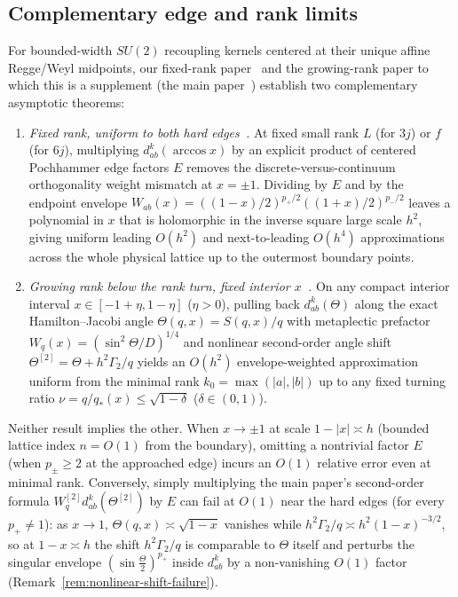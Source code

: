 \documentclass[11pt]{article}
\theoremstyle{definition}
\theoremstyle{remark}
\renewcommand{\_}{\oldunderscore\penalty0\hskip0pt\relax}
\begin{document}
\subsection{Complementary edge and rank limits}
For bounded-width $SU(2)$ recoupling kernels centered at their unique affine Regge/Weyl midpoints, our fixed-rank paper~\cite{LewisFixedRank} and the growing-rank paper to which this is a supplement (the main paper~\cite{LewisGrowingRank}) establish two complementary asymptotic theorems:
\begin{enumerate}[leftmargin=2em,itemsep=2pt]
\item \emph{Fixed rank, uniform to both hard edges~\cite{LewisFixedRank}.} At fixed small rank $L$ (for $3j$) or $f$ (for $6j$),
  multiplying $d^k_{ab}(\arccos x)$ by an explicit product of centered Pochhammer edge factors $E$ removes the
  discrete-versus-continuum orthogonality weight mismatch at $x=\pm 1$. Dividing by $E$ and by the endpoint envelope
  $W_{ab}(x)=((1-x)/2)^{p_+/2}((1+x)/2)^{p_-/2}$ leaves a polynomial in $x$ that is holomorphic in the inverse square large scale
  $h^2$, giving uniform leading $O(h^2)$ and next-to-leading $O(h^4)$ approximations across the whole physical lattice up to the
  outermost boundary points.
\item \emph{Growing rank below the rank turn, fixed interior $x$~\cite{LewisGrowingRank}.} On any compact interior interval
  $x\in[-1+\eta,1-\eta]$ ($\eta>0$), pulling back $d^k_{ab}(\Theta)$ along the exact Hamilton--Jacobi angle
  $\Theta(q,x)=S(q,x)/q$ with metaplectic prefactor $W_q(x)=(\sin^2\Theta/D)^{1/4}$ and nonlinear second-order angle shift
  $\Theta^{[2]}=\Theta+h^2\Gamma_2/q$ yields an $O(h^2)$ envelope-weighted approximation uniform from the minimal rank
  $k_0=\max(|a|,|b|)$ up to any fixed turning ratio $\nu=q/q_*(x)\le\sqrt{1-\delta}$ ($\delta\in(0,1)$).
\end{enumerate}

Neither result implies the other. When $x\to\pm 1$ at scale $1-|x|\asymp h$ (bounded lattice index $n=O(1)$ from the boundary),
  omitting a nontrivial factor $E$ (when $p_\pm\ge2$ at the approached edge) incurs an $O(1)$ relative error even at
  minimal rank. Conversely, simply multiplying the main paper's second-order
  formula $W_q^{[2]}d^k_{ab}(\Theta^{[2]})$ by $E$ can fail at $O(1)$ near the hard edges (for every $p_+\ne1$): as
  $x\to 1$,
  $\Theta(q,x)\asymp\sqrt{1-x}$ vanishes while $h^2\Gamma_2/q\asymp h^2(1-x)^{-3/2}$, so at $1-x\asymp h$ the shift
  $h^2\Gamma_2/q$ is comparable to $\Theta$ itself and perturbs the singular envelope $(\sin\frac{\Theta}{2})^{p_+}$ inside
  $d^k_{ab}$ by a non-vanishing $O(1)$ factor (Remark~\ref{rem:nonlinear-shift-failure}).
\end{document}
